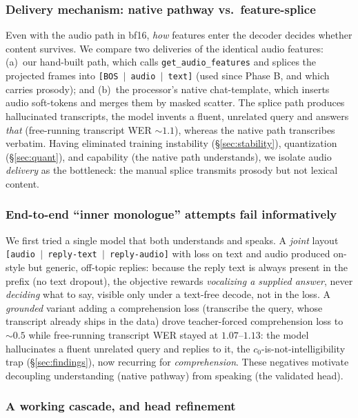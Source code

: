 \documentclass[11pt]{article}
\begin{document}
\subsubsection{Delivery mechanism: native pathway vs.\ feature-splice}
\label{sec:delivery}
Even with the audio path in bf16, \emph{how} features enter the decoder decides
whether content survives. We compare two deliveries of the identical audio
features: (a)~our hand-built path, which calls \texttt{get\_audio\_features} and
splices the projected frames into \texttt{[BOS $\mid$ audio $\mid$ text]} (used since
Phase B, and which carries prosody); and (b)~the processor's native chat-template,
which inserts audio soft-tokens and merges them by masked scatter. The splice path
produces hallucinated transcripts, the model invents a fluent, unrelated query
and answers \emph{that} (free-running transcript WER ${\sim}1.1$), whereas the
native path transcribes verbatim. Having eliminated training instability
(\S\ref{sec:stability}), quantization (\S\ref{sec:quant}), and capability (the
native path understands), we isolate audio \emph{delivery} as the bottleneck: the
manual splice transmits prosody but not lexical content.

\subsubsection{End-to-end ``inner monologue'' attempts fail informatively}
\label{sec:monologue}
We first tried a single model that both understands and speaks. A \emph{joint}
layout \texttt{[audio $\mid$ reply-text $\mid$ reply-audio]} with loss on text and
audio produced on-style but generic, off-topic replies: because the reply text is
always present in the prefix (no text dropout), the objective rewards
\emph{vocalizing a supplied answer}, never \emph{deciding} what to say, visible
only under a text-free decode, not in the loss. A \emph{grounded} variant adding a
comprehension loss (transcribe the query, whose transcript already ships in the
data) drove teacher-forced comprehension loss to ${\sim}0.5$ while free-running
transcript WER stayed at $1.07$--$1.13$: the model hallucinates a fluent unrelated
query and replies to it, the $c_0$-is-not-intelligibility trap
(\S\ref{sec:findings}), now recurring for \emph{comprehension}. These negatives
motivate decoupling understanding (native pathway) from speaking (the validated
head).

\subsubsection{A working cascade, and head refinement}
\label{sec:cascade}
\end{document}
